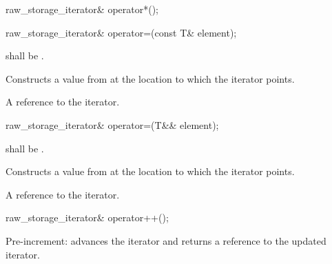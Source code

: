 \begin{itemdecl}
raw_storage_iterator& operator*();
\end{itemdecl}

\begin{itemdescr}
\pnum
\returns
{}
\end{itemdescr}

\begin{itemdecl}
raw_storage_iterator& operator=(const T& element);
\end{itemdecl}

\begin{itemdescr}
\pnum
\requires
{} shall be .

\pnum
\effects
Constructs a value from  at the location to which the iterator points.

\pnum
\returns
A reference to the iterator.
\end{itemdescr}

\begin{itemdecl}
raw_storage_iterator& operator=(T&& element);
\end{itemdecl}

\begin{itemdescr}
\pnum
\requires
{} shall be .

\pnum
\effects
Constructs a value from  at the location to which
the iterator points.

\pnum
\returns
A reference to the iterator.
\end{itemdescr}

\begin{itemdecl}
raw_storage_iterator& operator++();
\end{itemdecl}

\begin{itemdescr}
\pnum
\effects
Pre-increment:  advances the iterator and returns a reference to the updated iterator.
\end{itemdescr}

